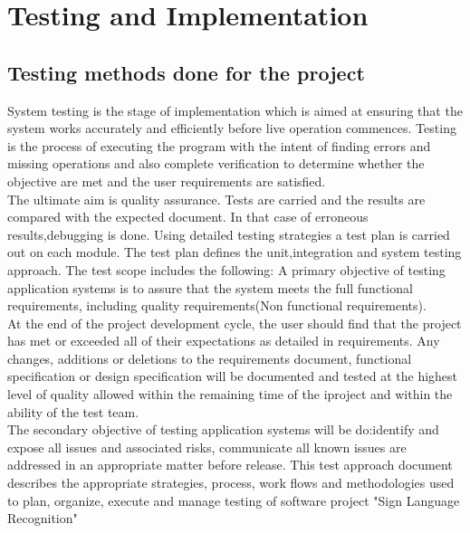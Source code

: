 \chapter{Testing and Implementation}
\section{Testing methods done for the project}
\par
System testing is the stage of implementation which is aimed at ensuring that
the system works accurately and efficiently before live operation commences.
Testing is the process of executing the program with the intent of finding
errors and missing operations and also complete verification to determine
whether the objective are met and the user requirements are satisfied.\\

The ultimate aim is quality assurance. Tests are carried and the results are
compared with the expected document. In that case of erroneous results,debugging
is done. Using detailed testing strategies a test plan is carried out on each
module. The test plan defines the unit,integration and system testing approach.
The test scope includes the following: A primary objective of testing
application systems is to assure that the system meets the full functional
requirements, including quality requirements(Non functional requirements).\\

At the end of the project development cycle, the user should find that the
project has met or exceeded all of their expectations as detailed in
requirements. Any changes, additions or deletions to the requirements document,
functional specification or design specification will be documented and tested
at the highest level of quality allowed within the remaining time of the
iproject and within the ability of the test team.\\

The secondary objective of testing application systems will be do:identify and
expose all issues and associated risks, communicate all known issues are
addressed in an appropriate matter before release. This test approach document
describes the appropriate strategies, process, work flows and methodologies
used to plan, organize, execute and manage testing of software project
"Sign Language Recognition"

\newpage

